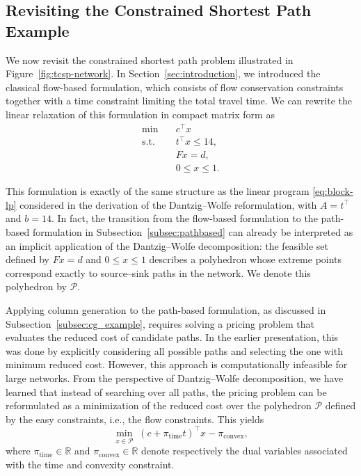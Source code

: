 \documentclass{book}
\theoremstyle{definition}
\numberwithin{algorithm_}{chapter}
\begin{document}
\newpage

\subsection{Revisiting the Constrained Shortest Path Example}

We now revisit the constrained shortest path problem illustrated in Figure~\ref{fig:tcsp-network}. In Section~\ref{sec:introduction}, we introduced the classical flow-based formulation, which consists of flow conservation constraints together with a time constraint limiting the total travel time.
We can rewrite the linear relaxation of this formulation in compact matrix form as
\begin{subequations}\label{eq:tcsp_flow_matrix}
\begin{align}
\min \quad & c^\top x \label{eq:tcsp_flow_matrix_obj} \\
\text{s.t.} \quad 
& t^\top x \le 14, \label{eq:tcsp_flow_matrix_time} \\
& F x = d, \label{eq:tcsp_flow_matrix_flow} \\
& 0 \le x \le 1.
\end{align}
\end{subequations}

This formulation is exactly of the same structure as the linear program \eqref{eq:block-lp} considered in the derivation of the Dantzig--Wolfe reformulation, with $A = t^\top$ and $b = 14$. In fact, the transition from the flow-based formulation to the path-based formulation in Subsection~\ref{subsec:pathbased} can already be interpreted as an implicit application of the Dantzig--Wolfe decomposition: the feasible set defined by $F x = d$ and $0 \le x \le 1$ describes a polyhedron whose extreme points correspond exactly to source--sink paths in the network. We denote this polyhedron by $\mathcal{P}$.

\bigskip

Applying column generation to the path-based formulation, as discussed in Subsection~\ref{subsec:cg_example}, requires solving a pricing problem that evaluates the reduced cost of candidate paths. In the earlier presentation, this was done by explicitly considering all possible paths and selecting the one with minimum reduced cost. However, this approach is computationally infeasible for large networks.
From the perspective of Dantzig--Wolfe decomposition, we have learned that instead of searching over all paths, the pricing problem can be reformulated as a minimization of the reduced cost over the polyhedron $\mathcal{P}$ defined by the easy constraints, i.e., the flow constraints. This yields
\[
\min_{x \in \mathcal{P}} \; (c + \pi_{\text{time}} t)^\top x - \pi_\text{convex},
\]
where $\pi_{\text{time}} \in \mathbb{R}$ and $\pi_{\text{convex}} \in \mathbb{R}$ denote respectively the dual variables associated with the time and convexity constraint.
\end{document}
